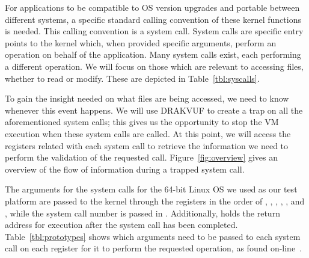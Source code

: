 \par For applications to be compatible to \ac{OS} version upgrades and portable between different systems, a specific standard calling convention of these kernel functions is needed. This calling convention is a system call. System calls are specific entry points to the kernel which, when provided specific arguments, perform an operation on behalf of the application. Many system calls exist, each performing a different operation. We will focus on those which are relevant to accessing files, whether to read or modify. These are depicted in Table~\ref{tbl:syscalls}.

\par To gain the insight needed on what files are being accessed, we need to know whenever this event happens. We will use DRAKVUF to create a trap on all the aforementioned system calls; this gives us the opportunity to stop the \ac{VM} execution when these system calls are called. At this point, we will access the registers related with each system call to retrieve the information we need to perform the validation of the requested call. Figure~\ref{fig:overview} gives an overview of the flow of information during a trapped system call. 

\par The arguments for the system calls for the 64-bit Linux \ac{OS} we used as our test platform are passed to the kernel through the registers in the order of , , , , , and , while the system call number is passed in . Additionally,  holds the return address for execution after the system call has been completed. Table~\ref{tbl:prototypes} shows which arguments need to be passed to each system call on each register for it to perform the requested operation, as found on-line~\cite{syscalls}.


